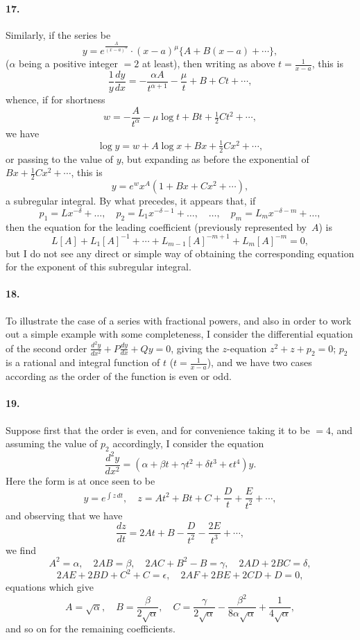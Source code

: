 \documentclass[11pt,a4paper]{article}
\theoremstyle{definition}
\begin{document}
\paragraph{17.} Similarly, if the series be
\[
y = e^{\frac{A}{(x-a)^{\alpha}}} \cdot (x-a)^{\mu}\{A + B(x-a) + \cdots\},
\]
($\alpha$ being a positive integer $= 2$ at least), then writing as above $t = \frac{1}{x-a}$, this is
\[
\frac{1}{y}\frac{dy}{dx} = -\frac{\alpha A}{t^{\alpha+1}} - \frac{\mu}{t} + B + Ct + \cdots,
\]
whence, if for shortness
\[
w = -\frac{A}{t^{\alpha}} - \mu\log t + Bt + \tfrac{1}{2}Ct^{2} + \cdots,
\]
we have
\[
\log y = w + A\log x + Bx + \tfrac{1}{2}Cx^{2} + \cdots,
\]
or passing to the value of $y$, but expanding as before the exponential of $Bx + \tfrac{1}{2}Cx^{2} + \cdots$, this is
\[
y = e^{w}x^{A}(1 + Bx + Cx^{2} + \cdots),
\]
a subregular integral. By what precedes, it appears that, if
\[
p_{1} = Lx^{-\delta} + \ldots, \quad p_{2} = L_{1}x^{-\delta-1} + \ldots, \quad \ldots, \quad p_{m} = L_{m}x^{-\delta-m} + \ldots,
\]
then the equation for the leading coefficient (previously represented by~$A$) is
\[
L[A] + L_{1}[A]^{-1} + \cdots + L_{m-1}[A]^{-m+1} + L_{m}[A]^{-m} = 0,
\]
but I do not see any direct or simple way of obtaining the corresponding equation for the exponent of this subregular integral.

\paragraph{18.} To illustrate the case of a series with fractional powers, and also in order to work out a simple example with some completeness, I consider the differential equation of the second order $\frac{d^{2}y}{dx^{2}} + P\frac{dy}{dx} + Qy = 0$, giving the $z$-equation $z^{2} + z + p_{2} = 0$; $p_{2}$ is a rational and integral function of $t$ ($t = \frac{1}{x-a}$), and we have two cases according as the order of the function is even or odd.

\paragraph{19.} Suppose first that the order is even, and for convenience taking it to be $= 4$, and assuming the value of $p_{2}$ accordingly, I consider the equation
\[
\frac{d^{2}y}{dx^{2}} = (\alpha + \beta t + \gamma t^{2} + \delta t^{3} + \epsilon t^{4})y.
\]
Here the form is at once seen to be
\[
y = e^{\int z\,dt}, \quad z = At^{2} + Bt + C + \frac{D}{t} + \frac{E}{t^{2}} + \cdots,
\]
and observing that we have
\[
\frac{dz}{dt} = 2At + B - \frac{D}{t^{2}} - \frac{2E}{t^{3}} + \cdots,
\]
we find
\[
A^{2} = \alpha, \quad 2AB = \beta, \quad 2AC + B^{2} - B = \gamma, \quad 2AD + 2BC = \delta,
\]
\[
2AE + 2BD + C^{2} + C = \epsilon, \quad 2AF + 2BE + 2CD + D = 0,
\]
equations which give
\[
A = \sqrt{\alpha}, \quad B = \frac{\beta}{2\sqrt{\alpha}}, \quad C = \frac{\gamma}{2\sqrt{\alpha}} - \frac{\beta^{2}}{8\alpha\sqrt{\alpha}} + \frac{1}{4\sqrt{\alpha}},
\]
and so on for the remaining coefficients.
\end{document}
